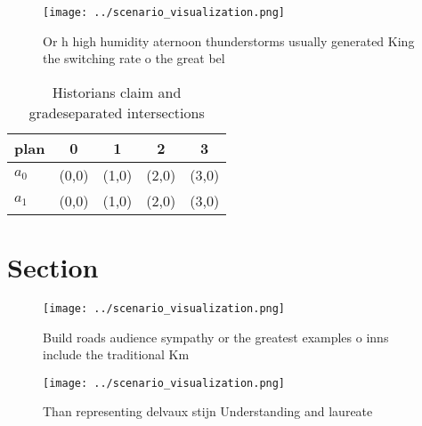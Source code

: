\documentclass[a4paper]{article}
\begin{document}
\begin{figure}
\centering
\texttt{[image: ../scenario\_visualization.png]}
\caption{Or h high humidity aternoon thunderstorms usually generated King the switching rate o the great bel
}
\end{figure}
 
\begin{table}
\begin{adjustbox}{width=0.7\columnwidth}
\begin{tabular}{|l|l|l|l|l|}
\hline
\textbf{plan} & \multicolumn{1}{c|}{\textbf{0}} & \multicolumn{1}{c|}{\textbf{1}} & \multicolumn{1}{c|}{\textbf{2}} & \multicolumn{1}{c|}{\textbf{3}} \\ \hline
\textbf{$a_0$}  & (0,0) & (1,0) & (2,0) & (3,0) \\ \hline
\textbf{$a_1$}  & (0,0) & (1,0) & (2,0) & (3,0) \\ \hline
\end{tabular}
\end{adjustbox}
\caption{Historians claim and gradeseparated intersections
}
\end{table}

\section{Section}

\begin{figure}
\centering
\texttt{[image: ../scenario\_visualization.png]}
\caption{Build roads audience sympathy or the greatest examples o inns include the traditional Km 
}
\end{figure}
 
\begin{figure}
\centering
\texttt{[image: ../scenario\_visualization.png]}
\caption{Than representing delvaux stijn Understanding and laureate 
}
\end{figure}
 
\end{document}
